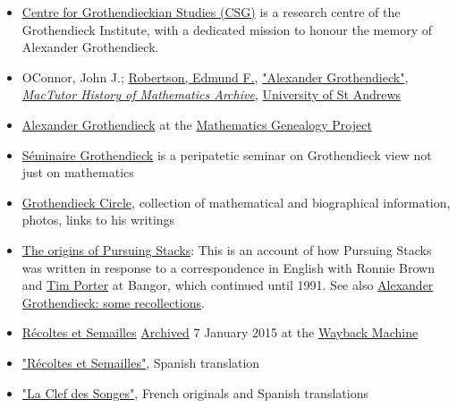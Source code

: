 \begin{itemize}
\tightlist
\item
  {\href{https://csg.igrothendieck.org/}{Centre for Grothendieckian Studies (CSG)} is a research centre of the Grothendieck Institute, with a dedicated mission to honour the memory of Alexander Grothendieck.}
\item
  {O\textquotesingle Connor, John J.; \href{https://en.wikipedia.org/wiki/Edmund_F._Robertson}{Robertson, Edmund F.}, \href{https://mathshistory.st-andrews.ac.uk/Biographies/Grothendieck.html}{"Alexander Grothendieck"}, \emph{\href{https://en.wikipedia.org/wiki/MacTutor_History_of_Mathematics_Archive}{MacTutor History of Mathematics Archive}}, \href{https://en.wikipedia.org/wiki/University_of_St_Andrews}{University of St Andrews}{}}
\item
  {\href{https://mathgenealogy.org/id.php?id=31245}{Alexander Grothendieck}{ at the }\href{https://en.wikipedia.org/wiki/Mathematics_Genealogy_Project}{Mathematics Genealogy Project}}
\item
  {\href{http://users.unimi.it/barbieri/SG.html}{Séminaire Grothendieck} is a peripatetic seminar on Grothendieck view not just on mathematics}
\item
  {\href{https://www.grothendieckcircle.org}{Grothendieck Circle}, collection of mathematical and biographical information, photos, links to his writings}
\item
  {\href{https://archive.today/20120722054515/http://www.bangor.ac.uk/r.brown/pstacks.htm}{The origins of \textquotesingle Pursuing Stacks\textquotesingle{}}: This is an account of how \textquotesingle Pursuing Stacks\textquotesingle{} was written in response to a correspondence in English with Ronnie Brown and \href{https://web.archive.org/web/20100503001504/http://www.bangor.ac.uk/~mas013/}{Tim Porter} at Bangor, which continued until 1991. See also \href{http://education.lms.ac.uk/2014/12/alexander-grothendieck-some-recollections/}{Alexander Grothendieck: some recollections}.}
\item
  {\href{http://acm.math.spbu.ru/RS/}{Récoltes et Semailles} \href{https://web.archive.org/web/20150107140335/http://acm.math.spbu.ru/RS/}{Archived}{ 7 January 2015 at the }\href{https://en.wikipedia.org/wiki/Wayback_Machine}{Wayback Machine}}
\item
  {\href{http://matematicas.unex.es/~navarro/res/llavecarmona.pdf}{"Récoltes et Semailles"}, Spanish translation}
\item
  {\href{http://matematicas.unex.es/~navarro/res/}{"La Clef des Songes"}, French originals and Spanish translations}

\end{itemize}
